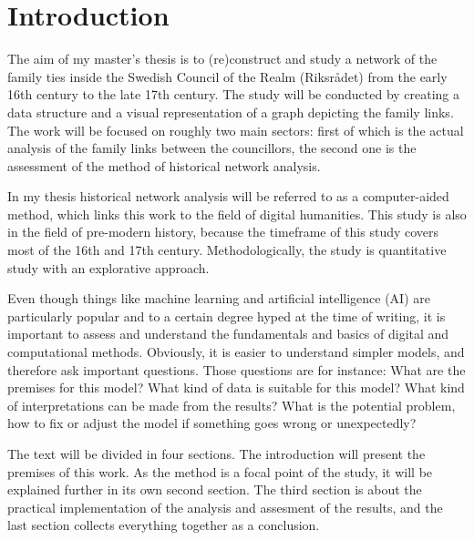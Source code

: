 %
\section{Introduction}
The aim of my master's thesis is to (re)construct and study a network of the family ties inside the Swedish Council of the Realm (Riksrådet) from the early 16th century to the late 17th century. The study will be conducted by creating a data structure and a visual representation of a graph depicting the family links. The work will be focused on roughly two main sectors: first of which is the actual analysis of the family links between the councillors, the second one is the assessment of the method of historical network analysis. 

In my thesis historical network analysis will be referred to as a computer-aided method, which links this work to the field of digital humanities. This study is also in the field of pre-modern history, because the timeframe of this study covers most of the 16th and 17th century. Methodologically, the study is quantitative study with an explorative approach.

Even though things like machine learning and artificial intelligence (AI) are particularly popular and to a certain degree hyped at the time of writing, it is important to assess and understand the fundamentals and basics of digital and computational methods. Obviously, it is easier to understand simpler models, and therefore ask important questions. Those questions are for instance: What are the premises for this model? What kind of data is suitable for this model? What kind of interpretations can be made from the results? What is the potential problem, how to fix or adjust the model if something goes wrong or unexpectedly?

The text will be divided in four sections. The introduction will present the premises of this work. As the method is a focal point of the study, it will be explained further in its own second section. The third section is about the practical implementation of the analysis and assesment of the results, and the last section collects everything together as a conclusion. 

